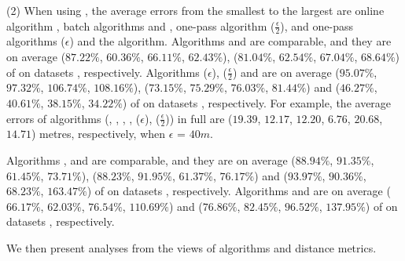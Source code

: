 \sstab (2) When using \sed, the average errors from the smallest
to the largest are online algorithm \squishe, batch algorithms \tpa and \dpa,
one-pass algorithm \cised($\frac{\epsilon}{2}$), and one-pass algorithms \cised(${\epsilon}$) and the \opt algorithm.
%
Algorithms \tpa and \dpa are comparable, and they are on average
{($87.22\%$, $60.36\%$, $66.11\%$, $62.43\%$), ($81.04\%$, $62.54\%$, $67.04\%$, $68.64\%$)} of \opt on datasets \dSets, respectively.
Algorithms \cised(${\epsilon}$), \cised($\frac{\epsilon}{2}$) and \squishe are on average {($95.07\%$, $97.32\%$, $106.74\%$, $108.16\%$), ($73.15\%$, $75.29\%$, $76.03\%$, $81.44\%$) and ($46.27\%$, $40.61\%$, $38.15\%$, $34.22\%$)} of \opt on datasets \dSets, respectively.
%
For example, the average errors of algorithms
(\opt, \tpa, \dpa, \squishe, \cised(${\epsilon}$), \cised($\frac{\epsilon}{2}$)) in full \mopsi are ($19.39$, $12.17$, $12.20$, $6.76$, $20.68$, $14.71$) metres, respectively, when $\epsilon$ = $40m$.
%


Algorithms \tpa, \opwa and \interval are comparable, and they are on average
{($88.94\%$, $91.35\%$, $61.45\%$, $73.71\%$), ($88.23\%$, $91.95\%$, $61.37\%$, $76.17\%$) and ($93.97\%$, $90.36\%$, $68.23\%$, $163.47\%$)} of \opt on datasets \dSets, respectively.
Algorithms \intersec and \dpa are on average ($66.17\%$, $62.03\%$, $76.54\%$, $110.69\%$) and ($76.86\%$, $82.45\%$, $96.52\%$, $137.95\%$) of \opt on datasets \dSets, respectively.


We then present analyses from the views of \lsa algorithms and distance metrics.

